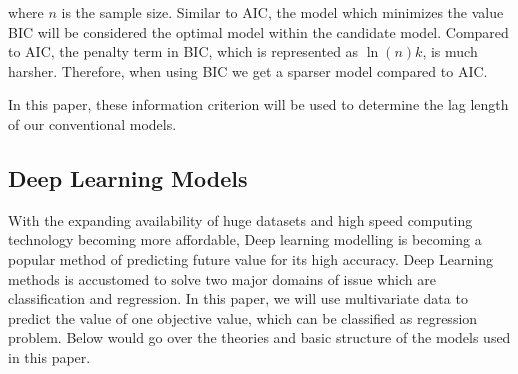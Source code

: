 \noindent where $n$ is the sample size. Similar to AIC, the model which minimizes the value BIC will be considered the optimal model within the candidate model. Compared to AIC, the penalty term in BIC, which is represented as $\ln (n) k$, is much harsher. Therefore, when using BIC we get a sparser model compared to AIC. 

In this paper, these information criterion will be used to determine the lag length of our conventional models. 

\subsection{Deep Learning Models}
With the expanding availability of huge datasets and high speed computing technology becoming more affordable, Deep learning modelling is becoming a popular method of predicting future value for its high accuracy. Deep Learning methods is accustomed to solve two major domains of issue which are classification and regression. In this paper, we will use multivariate data to predict the value of one objective value, which can be classified as regression problem. Below would go over the theories and basic structure of the models used in this paper.
